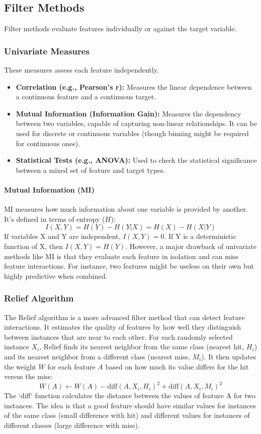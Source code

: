 \documentclass{article}
\begin{document}
\begin{multicols}{2}
\subsection{Filter Methods}
Filter methods evaluate features individually or against the target variable.

\subsubsection{Univariate Measures}
These measures assess each feature independently.
\begin{itemize}
    \item \textbf{Correlation (e.g., Pearson's r):} Measures the linear dependence between a continuous feature and a continuous target.
    \item \textbf{Mutual Information (Information Gain):} Measures the dependency between two variables, capable of capturing non-linear relationships. It can be used for discrete or continuous variables (though binning might be required for continuous ones).
    \item \textbf{Statistical Tests (e.g., ANOVA):} Used to check the statistical significance between a mixed set of feature and target types.
\end{itemize}

\paragraph{Mutual Information (MI)}
MI measures how much information about one variable is provided by another. It's defined in terms of entropy ($H$):
$$ I(X, Y) = H(Y) - H(Y|X) = H(X) - H(X|Y) $$
If variables X and Y are independent, $I(X,Y) = 0$. If Y is a deterministic function of X, then $I(X,Y) = H(Y)$. However, a major drawback of univariate methods like MI is that they evaluate each feature in isolation and can miss feature interactions. For instance, two features might be useless on their own but highly predictive when combined.

\subsubsection{Relief Algorithm}
The Relief algorithm is a more advanced filter method that can detect feature interactions. It estimates the quality of features by how well they distinguish between instances that are near to each other. For each randomly selected instance $X_i$, Relief finds its nearest neighbor from the same class (nearest hit, $H_i$) and its nearest neighbor from a different class (nearest miss, $M_i$). It then updates the weight $W$ for each feature $A$ based on how much its value differs for the hit versus the miss:
$$ W(A) \leftarrow W(A) - \text{diff}(A, X_i, H_i)^2 + \text{diff}(A, X_i, M_i)^2 $$
The `diff` function calculates the distance between the values of feature A for two instances. The idea is that a good feature should have similar values for instances of the same class (small difference with hit) and different values for instances of different classes (large difference with miss).


\end{multicols}
\end{document}
